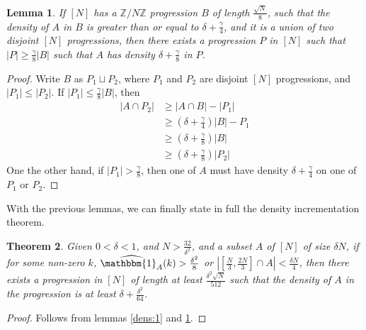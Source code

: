 \documentclass[12pt]{article}
\newtheorem{thm}{Theorem}[section]
\newtheorem{lem}[thm]{Lemma}
\theoremstyle{definition}
\newcommand{\znz}{\mathbb{Z}/N\mathbb{Z}}
\newcommand{\indi}{\mathbbm{1}}
\begin{document}
\begin{lem} \label{dens:2}
    If $[N]$ has a $\znz$ progression $B$ of length $\frac{\sqrt{N}}{8}$, such that the density of $A$ in $B$ is greater than or equal to $\delta + \frac{\gamma}{4}$, and it is a union of two disjoint $[N]$ progressions, then there exists a progression $P$ in $[N]$ such that $|P| \geq \frac{\gamma}{8} |B|$ such that $A$ has density $\delta + \frac{\gamma}{8}$ in $P$.
\end{lem}

\begin{proof}
    Write $B$ as $P_1 \sqcup P_2$, where $P_1$ and $P_2$ are disjoint $[N]$ progressions, and $|P_1| \leq |P_2|$. If $|P_1| \leq \frac{\gamma}{8} |B|$, then
    \begin{align*}
        |A \cap P_2| &\geq |A \cap B| - |P_1|\\
        &\geq \left( \delta + \frac{\gamma}{4} \right)|B| - P_1 \\
        &\geq \left( \delta + \frac{\gamma}{8} \right)|B| \\
        &\geq \left( \delta + \frac{\gamma}{8} \right)|P_2|
    \end{align*}
    One the other hand, if $|P_1| > \frac{\gamma}{8}$, then one of $A$ must have density $\delta + \frac{\gamma}{4}$ on one of $P_1$ or $P_2$.
\end{proof}

With the previous lemmas, we can finally state in full the density incrementation theorem.
\begin{thm}
    Given $0 < \delta < 1$, and $N > \frac{32}{\delta^2}$, and a subset $A$ of $[N]$ of size $\delta N$, if for some non-zero $k$, $\widehat{\indi_A}(k) > \frac{\delta^2}{8}$ or $\left| \left[ \frac{N}{3}, \frac{2N}{3} \right] \cap A \right| < \frac{\delta N}{4}$, then there exists a progression in $[N]$ of length at least $\frac{\delta^2 \sqrt{N}}{512}$ such that the density of $A$ in the progression is at least $\delta + \frac{\delta^2}{64}$.
\end{thm}

\begin{proof}
    Follows from lemmas \ref{dens:1} and \ref{dens:2}.
\end{proof}
\end{document}
